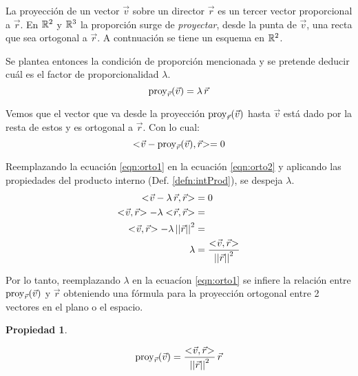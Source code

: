 \documentclass[a5paper,12pt,twoside]{book}
\newtheorem{prop}{{Propiedad}}[chapter]
\begin{document}
La proyección de un vector $\Vec{v}$ sobre un director $\Vec{r}$ es un tercer vector proporcional a $\Vec{r}$. En $\mathbb{R}^2$ y $\mathbb{R}^3$ la proporción surge de \emph{proyectar}, desde la punta de $\Vec{v}$, una recta que sea ortogonal a $\Vec{r}$. A contnuación se tiene un esquema en $\mathbb{R}^2$.

\begin{center}
\end{center}

Se plantea entonces la condición de proporción mencionada y se pretende deducir cuál es el factor de proporcionalidad $\lambda$.
\begin{equation}
    \operatorname{proy}_{\Vec{r}}(\Vec{v}) = \lambda \, \Vec{r}
    \label{eqn:orto1}
\end{equation}

Vemos que el vector que va desde la proyección $\operatorname{proy}_{\Vec{r}}(\Vec{v})$ hasta $\Vec{v}$ está dado por la resta de estos y es ortogonal a $\Vec{r}$. Con lo cual:
\begin{equation}
    <\hspace{-0.8mm}\Vec{v} - \operatorname{proy}_{\Vec{r}}(\Vec{v}),\Vec{r}\hspace{-0.8mm}> = 0
    \label{eqn:orto2}
\end{equation}

Reemplazando la ecuación \ref{eqn:orto1} en la ecuación \ref{eqn:orto2} y aplicando las propiedades del producto interno (Def. \ref{defn:intProd}), se despeja $\lambda$.
\begin{align*}
    \intProd{\Vec{v} - \lambda \, \Vec{r}}{\Vec{r}} &= 0
    \\
    \intProd{\Vec{v}}{\Vec{r}} - \lambda \intProd{\Vec{r}}{\Vec{r}} &=
    \\
    \intProd{\Vec{v}}{\Vec{r}} - \lambda \, \nnorm{\Vec{r}}^2 &=
    \\
    \lambda &= \frac{\intProd{\Vec{v}}{\Vec{r}}}{\nnorm{\Vec{r}}^2}
\end{align*}

Por lo tanto, reemplazando $\lambda$ en la ecuacíon \ref{eqn:orto1} se infiere la relación entre $\operatorname{proy}_{\Vec{r}}(\Vec{v})$ y $\Vec{r}$ obteniendo una fórmula para la proyección ortogonal entre 2 vectores en el plano o el espacio.

\begin{mdframed}[style=MyFrame1]
    \begin{prop}
        \label{prop:proyOrto}
    \end{prop}
    \begin{equation*}
        \operatorname{proy}_{\Vec{r}}(\Vec{v}) = \frac{<\hspace{-0.8mm}\Vec{v},\Vec{r}\hspace{-0.8mm}>}{{\left|\left| {\Vec{r}} \right|\right|}^2} \, \Vec{r}
    \end{equation*}
\end{mdframed}
\end{document}
